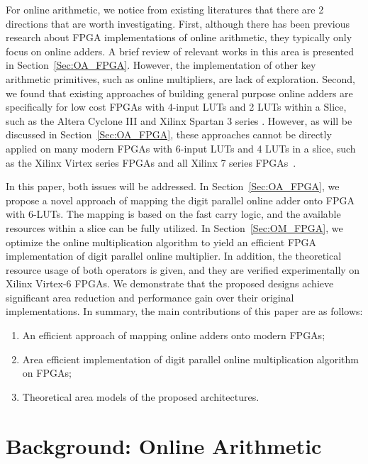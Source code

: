 \documentclass[conference]{IEEEtran}
\begin{document}
For online arithmetic, we notice from existing literatures that there are 2 directions that are worth investigating. First, although there has been previous research about FPGA implementations of online arithmetic, they typically only focus on online adders. A brief review of relevant works in this area is presented in Section~\ref{Sec:OA_FPGA}. However, the implementation of other key arithmetic primitives, such as online multipliers, are lack of exploration. Second, we found that existing approaches of building general purpose online adders are specifically for low cost FPGAs with 4-input LUTs and 2 LUTs within a Slice, such as the Altera Cyclone III \cite{AlteraCyclone} and Xilinx Spartan 3 series \cite{XilinxSpartan}. However, as will be discussed in Section~\ref{Sec:OA_FPGA}, these approaches cannot be directly applied on many modern FPGAs with 6-input LUTs and 4 LUTs in a slice, such as the Xilinx Virtex series FPGAs and all Xilinx 7 series FPGAs~\cite{Virtex7}.

In this paper, both issues will be addressed. In Section~\ref{Sec:OA_FPGA}, we propose a novel approach of mapping the digit parallel online adder onto FPGA with 6-LUTs. The mapping is based on the fast carry logic, and the available resources within a slice can be fully utilized. In Section~\ref{Sec:OM_FPGA}, we optimize the online multiplication algorithm to yield an efficient FPGA implementation of digit parallel online multiplier. In addition, the theoretical resource usage of both operators is given, and they are verified experimentally on Xilinx Virtex-6 FPGAs. We demonstrate that the proposed designs achieve significant area reduction and performance gain over their original implementations. In summary, the main contributions of this paper are as follows:
\begin{enumerate}
    \item An efficient approach of mapping online adders onto modern FPGAs;
    \item Area efficient implementation of digit parallel online multiplication algorithm on FPGAs;
    \item Theoretical area models of the proposed architectures.
\end{enumerate}



\section{Background: Online Arithmetic}\label{Sec:Background}
\end{document}
